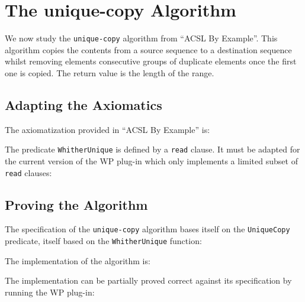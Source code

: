 \section{The \textsf{unique-copy} Algorithm}
\label{unique-copy}

We now study the \texttt{unique-copy} algorithm from ``ACSL By Example''.
This algorithm copies the contents from a source sequence to a destination
sequence whilst removing elements consecutive groups of duplicate elements once
the first one is copied. The return value is the length of the range.

\subsection{Adapting the Axiomatics}

The axiomatization provided in ``ACSL By Example'' is:


The predicate \texttt{WhitherUnique} is defined by a \texttt{read} clause.
It must be adapted for the current version of the \textsf{WP} plug-in which
only implements a limited subset of \texttt{read} clauses:


\subsection{Proving the Algorithm}

The specification of the \texttt{unique-copy} algorithm bases itself on the
\texttt{UniqueCopy} predicate, itself based on the \texttt{WhitherUnique}
function:


\clearpage
The implementation of the algorithm is:


The implementation can be partially proved correct against its specification by
running the \textsf{WP} plug-in: 
